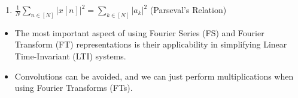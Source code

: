 \begin{definition}
\begin{enumerate}
        \item \( \frac{1}{N} \sum_{n \in [N]} |x[n]|^2 = \sum_{k \in [N]} |a_k|^2 \) \hspace{10pt} (Parseval's Relation)
    \end{enumerate}

    \begin{itemize}
        \item The most important aspect of using Fourier Series (FS) and Fourier Transform (FT) representations is their applicability in simplifying Linear Time-Invariant (LTI) systems.
        \item Convolutions can be avoided, and we can just perform multiplications when using Fourier Transforms (FTs).
    \end{itemize}
\end{definition}



